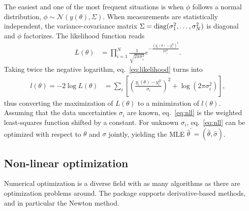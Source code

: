 \documentclass[article]{jss}
\begin{document}
The easiest and one of the most frequent situations is when $\phi$ follows a normal distribution, $\phi\sim\mathcal N(y(\theta), \Sigma)$. When measurements are statistically independent, the variance-covariance matrix $\Sigma = {\rm diag}(\sigma_1^2, \dots, \sigma_N^2)$ is diagonal and $\phi$ factorizes. The likelihood function reads 
\begin{align}
	L(\theta) &= \prod_{i = 1}^N \frac{1}{\sqrt{2\pi\sigma_i^2}} e^{-\frac{(y_i(\theta)-y_i^D)^2}{2\sigma_i^2}} .
	\label{eq:likelihood}
\end{align}
Taking twice the negative logarithm, eq.~\eqref{eq:likelihood} turns into
\begin{align}
	l(\theta) = -2\log L(\theta) &= \sum_i \left[\left(\frac{y_i(\theta) - y_i^D}{\sigma_i}\right)^2 + \log(2\pi\sigma_i^2)\right],
	\label{eq:nll}
\end{align}
thus converting the maximization of $L(\theta)$ to a minimization of $l(\theta)$.
Assuming that the data uncertainties $\sigma_i$ are known, eq.~\eqref{eq:nll} is the weighted least-squares function shifted by a constant. For unknown $\sigma_i$, eq.~\eqref{eq:nll} can be optimized with respect to $\theta$ and $\sigma$ jointly, yielding the MLE $\hat\theta^{\prime} = (\hat\theta, \hat\sigma)$. 

\subsection{Non-linear optimization}

Numerical optimization is a diverse field with as many algorithms as there are optimization problems around. The  package supports derivative-based methods, and in particular the Newton method.
\end{document}
